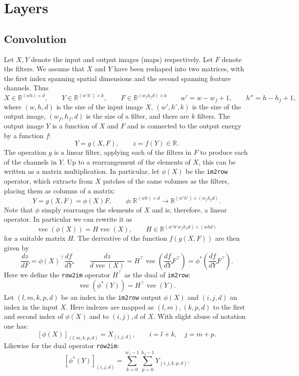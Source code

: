 \documentclass[12pt]{article}
\newcommand{\real}{\mathbb{R}}
\newcommand{\vv}{\operatorname{vec}}
\begin{document}
\section{Layers}

\subsection{Convolution}\label{s:convolution}

Let $X,Y$ denote the input and output images (maps) respectively. Let $F$ denote the filters. We assume that $X$ and $Y$ have been reshaped into two matrices, with the first index spanning spatial dimensions and the second spanning feature channels. Thus
\[
 X\in\real^{(wh) \times d}, \qquad
 Y\in\real^{(w'h') \times k}, \qquad
 F\in\real^{(w_fh_fd) \times k}
 \qquad
 w' = w - w_f + 1,
 \qquad
 h'' = h - h_f + 1,
\]
where $(w,h,d)$ is the size of the input image $X$, $(w',h',k)$ is the size of the output image, $(w_f,h_f,d)$ is the size of a filter, and there are $k$ filters. The output image $Y$ is a function of $X$ and $F$ and is connected to the output energy by a function $f$:
\[
Y = g(X,F),
\qquad
z = f(Y) \in \real.
\]
The operation $g$ is a linear filter, applying each of the filters in $F$ to produce each of the channels in $Y$. Up to a rearrangement of the elements of $X$, this can be written as a matrix multiplication. In particular, let $\phi(X)$ be the {\tt im2row} operator, which extracts from $X$ patches of the same volumes as the filters, placing them as columns of a matrix:
\[
 Y = g(X,F) = \phi(X) F,\qquad 
 \phi: \real^{(wh)\times d} \rightarrow \real^{(w'h')\times(w_fh_fd)}.
\]
Note that $\phi$ simply rearranges the elements of $X$ and is, therefore, a linear operator. In particular we can rewrite it as
\[
 \vv(\phi(X)) = H \vv(X), \qquad H \in \real^{(w'h'w_fh_fd) \times (whd)}
\]
for a suitable matrix $H$. The derivative of the function $f(g(X,F))$ are then given by
\[
\boxed{
\frac{dz}{dF}
=
\phi(X)^\top\frac{d f}{d Y},
\qquad
\frac{d z}{d \vv(X)}
=
H^\top
\vv\left(
\frac{d f}{d Y}F^\top
\right)
=
\phi^*\left(
\frac{d f}{d Y}F^\top
\right).
}
\]
Here we define the {\tt row2im} operator $H^\top$ as the dual of {\tt im2row}:
\[
 \vv(\phi^*(Y)) = H^\top \vv(Y).
\]
Let $(l,m,k,p,d)$ be an index in the {\tt im2row} output $\phi(X)$ and $(i,j,d)$ an index in the input $X$. Here indexes are mapped as $(l,m),(k,p,d)$ to the first and second index of $\phi(X)$ and to $(i,j),d$ of $X$. With slight abuse of notation one has:
\[
   [\phi(X)]_{(l,m,k,p,d)}= X_{(i,j,d)}, \qquad i=l+k,\quad j=m+p.
\]
Likewise for the dual operator {\tt row2im}:
\[
   [\phi^*(Y)]_{(i,j,d)} 
   = \sum_{k=0}^{w_f-1} \sum_{p=0}^{h_f-1} Y_{(i,j,k,p,d)}.
\]
\end{document}
